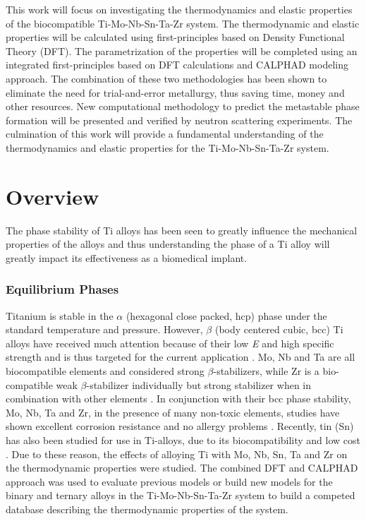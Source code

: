 This work will focus on investigating the thermodynamics and elastic properties of the biocompatible Ti-Mo-Nb-Sn-Ta-Zr system. The thermodynamic and elastic properties will be calculated using first-principles based on Density Functional Theory (DFT). The parametrization of the properties will be completed using an integrated first-principles based on DFT calculations and CALPHAD modeling approach. The combination of these two methodologies has been shown to eliminate the need for trial-and-error metallurgy, thus saving time, money and other resources. New computational methodology to predict the metastable phase formation will be presented and verified by neutron scattering experiments. The culmination of this work will provide a fundamental understanding of the thermodynamics and elastic properties for the Ti-Mo-Nb-Sn-Ta-Zr system. 


\section{Overview}

The phase stability of Ti alloys has been seen to greatly influence the mechanical properties of the alloys and thus understanding the phase of a Ti alloy will greatly impact its effectiveness as a biomedical implant.


\subsubsection{Equilibrium Phases}

Titanium is stable in the $\alpha$ (hexagonal close packed, hcp) phase under the standard temperature and pressure. However, $\beta$ (body centered cubic, bcc) Ti alloys have received much attention because of their low \textit{E} and high specific strength and is thus targeted for the current application \cite{Mei2011,Brailovski2011b}. Mo, Nb and Ta are all biocompatible elements and considered strong $\beta$-stabilizers, while Zr is a bio-compatible weak $\beta$-stabilizer individually but strong stabilizer when in combination with other elements \cite{Long1998a}.  In conjunction with their bcc phase stability, Mo, Nb, Ta and Zr, in the presence of many non-toxic elements, studies have shown excellent corrosion resistance and no allergy problems \cite{Tane2008a}. Recently, tin (Sn) has also been studied for use in Ti-alloys, due to its biocompatibility and low cost \cite{Niinomi2012}. Due to these reason, the effects of alloying Ti with Mo, Nb, Sn, Ta and Zr on the thermodynamic properties were studied. The combined DFT and CALPHAD approach was used to evaluate previous models or build new models for the binary and ternary alloys in the Ti-Mo-Nb-Sn-Ta-Zr system to build a competed database describing the thermodynamic properties of the system.

